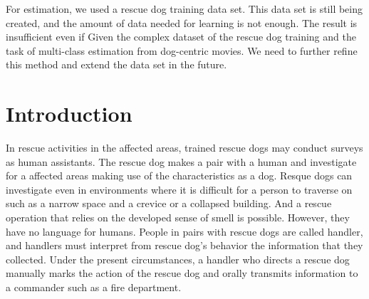 \documentclass[MIRU,submit,english]{miru2019e}
\begin{document}
For estimation, we used a rescue dog training data set.
This data set is still being created, and the amount of data needed for learning is not enough.
The result is insufficient even if Given the complex dataset of the rescue dog training and the task of multi-class estimation from dog-centric movies.
We need to further refine this method and extend the data set in the future.

\section{Introduction}
In rescue activities in the affected areas, trained rescue dogs may conduct surveys as human assistants.
The rescue dog makes a pair with a human and investigate for a affected areas making use of the characteristics as a dog.
Resque dogs can investigate even in environments where it is difficult for a person to traverse on such as a narrow space and a crevice or a collapsed building.
And a rescue operation that relies on the developed sense of smell is possible.
However, they have no language for humans.
People in pairs with rescue dogs are called handler, and handlers must interpret from rescue dog's behavior the information that they collected.
Under the present circumstances, a handler who directs a rescue dog manually marks the action of the rescue dog and orally transmits information to a commander such as a fire department.
\end{document}
